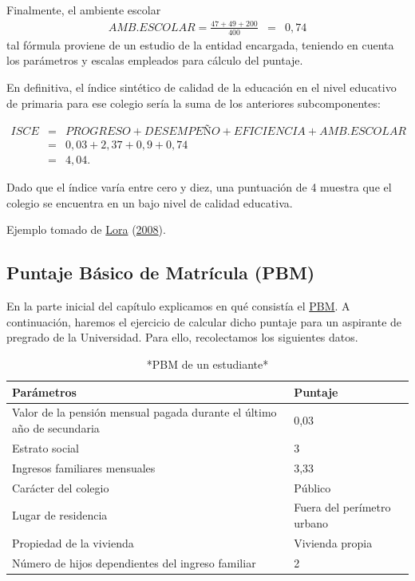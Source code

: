 \documentclass[
  11pt,
]{book}
\begin{document}
Finalmente, el ambiente escolar
\[\begin{eqnarray}
AMB.ESCOLAR= \frac{47+49+200}{400}
&=& 0,74
\end{eqnarray}\]
tal fórmula proviene de un estudio de la entidad encargada, teniendo en cuenta los parámetros y escalas empleados para cálculo del puntaje.

En definitiva, el índice sintético de calidad de la educación en el nivel educativo de primaria para ese colegio sería la suma de los anteriores subcomponentes:

\[\begin{eqnarray}
ISCE&=&PROGRESO+DESEMPEÑO+EFICIENCIA+AMB.ESCOLAR\\&=& 0,03+2,37+0,9+0,74\\&=&4,04.
\end{eqnarray}\]

Dado que el índice varía entre cero y diez, una puntuación de 4 muestra que el colegio se encuentra en un bajo nivel de calidad educativa.

Ejemplo tomado de \protect\hyperlink{ref-lora2008tecnicas}{Lora} (\protect\hyperlink{ref-lora2008tecnicas}{2008}).

\hypertarget{puntaje-buxe1sico-de-matruxedcula-pbm}{%
\subsection{Puntaje Básico de Matrícula (PBM)}\label{puntaje-buxe1sico-de-matruxedcula-pbm}}

En la parte inicial del capítulo explicamos en qué consistía el \protect\hyperlink{pbm}{PBM}. A continuación, haremos el ejercicio de calcular dicho puntaje para un aspirante de pregrado de la Universidad. Para ello, recolectamos los siguientes datos.

\begin{table}

\caption{\label{tab:unnamed-chunk-20}*PBM de un estudiante*}
\centering
\begin{tabular}[t]{l|l}
\hline
Parámetros & Puntaje\\
\hline
Valor de la pensión mensual pagada durante el último año de secundaria & 0,03\\
\hline
Estrato social & 3\\
\hline
Ingresos familiares mensuales & 3,33\\
\hline
Carácter del colegio & Público\\
\hline
Lugar de residencia & Fuera del perímetro urbano\\
\hline
Propiedad de la vivienda & Vivienda propia\\
\hline
Número de hijos dependientes del ingreso familiar & 2\\
\hline
\end{tabular}
\end{table}
\end{document}
